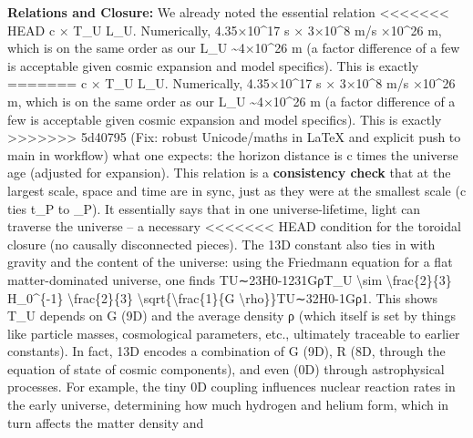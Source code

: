 \documentclass[]{article}
\begin{document}
{\textbf{Relations and Closure:} We already noted the essential relation
<<<<<<< HEAD
c × T\_U \approx L\_U\hspace{0pt}. Numerically, 4.35×10\^{}17 s × 3×10\^{}8
m/s ×10\^{}26 m, which is on the same order as our L\_U
\textasciitilde4×10\^{}26 m (a factor difference of a few is acceptable
given cosmic expansion and model specifics)\hspace{0pt}. This is exactly
=======
c × T\_U \approx L\_U​. Numerically, 4.35×10\^{}17 s × 3×10\^{}8 m/s ×10\^{}26 m, which is on the same order as our L\_U
\textasciitilde{}4×10\^{}26 m (a factor difference of a few is
acceptable given cosmic expansion and model specifics)​. This is exactly
>>>>>>> 5d40795 (Fix: robust Unicode/maths in LaTeX and explicit push to main in workflow)
what one expects: the horizon distance is c times the universe age
(adjusted for expansion). This relation is a \textbf{consistency check}
that at the largest scale, space and time are in sync, just as they were
at the smallest scale (c ties t\_P to \ell\_P). It essentially says that in
one universe-lifetime, light can traverse the universe -- a necessary
<<<<<<< HEAD
condition for the toroidal closure (no causally disconnected
pieces)\hspace{0pt}. The 13D constant also ties in with gravity and the
content of the universe: using the Friedmann equation for a flat
matter-dominated universe, one finds TU∼23H0-1\approx231GρT\_U
\textbackslash sim \textbackslash frac\{2\}\{3\} H\_0\^{}\{-1\} \approx
\textbackslash frac\{2\}\{3\}
\textbackslash sqrt\{\textbackslash frac\{1\}\{G
\textbackslash rho\}\}TU\hspace{0pt}∼32\hspace{0pt}H0-1\hspace{0pt}\hspace{0pt}Gρ1\hspace{0pt}\hspace{0pt}\hspace{0pt}.
This shows T\_U depends on G (9D) and the average density ρ (which
itself is set by things like particle masses, cosmological parameters,
etc., ultimately traceable to earlier constants). In fact, 13D encodes a
combination of G (9D), R (8D, through the equation of state of cosmic
components), and even \alpha (0D) through astrophysical
processes\hspace{0pt}. For example, the tiny 0D coupling \alpha influences
nuclear reaction rates in the early universe, determining how much
hydrogen and helium form, which in turn affects the matter density and
}
\end{document}
